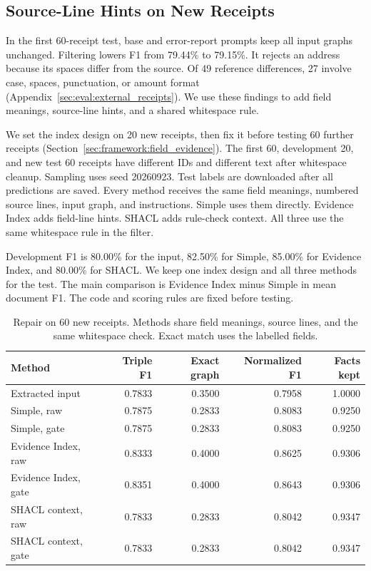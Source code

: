 \subsection{Source-Line Hints on New Receipts}
\label{sec:eval:receipt_followup}

In the first 60-receipt test, base and error-report prompts keep all input
graphs unchanged. Filtering lowers F1 from 79.44\% to 79.15\%.
It rejects an address because its spaces differ from the source.
Of 49 reference differences, 27 involve case, spaces, punctuation, or amount
format (Appendix~\ref{sec:eval:external_receipts}). We use these findings to
add field meanings, source-line hints, and a shared whitespace rule.

We set the index design on 20 new receipts, then fix it before testing 60
further receipts (Section~\ref{sec:framework:field_evidence}).
The first 60, development 20, and new test 60 receipts have different IDs
and different text after whitespace cleanup. Sampling uses seed 20260923.
Test labels are downloaded after all predictions are saved.
Every method receives the same field meanings, numbered source lines,
input graph, and instructions. Simple uses them directly.
Evidence Index adds field-line hints. SHACL adds rule-check context.
All three use the same whitespace rule in the filter.

Development F1 is 80.00\% for the input, 82.50\% for Simple,
85.00\% for Evidence Index, and 80.00\% for SHACL.
We keep one index design and all three methods for the test.
The main comparison is Evidence Index minus Simple in mean document F1.
The code and scoring rules are fixed before testing.

\begin{table}[t]
\centering
\caption{Repair on 60 new receipts. Methods share field meanings, source lines, and the same whitespace check. Exact match uses the labelled fields.}
\label{tab:receipt_followup}
\small
\begin{tabular}{lrrrr}
\toprule
Method & Triple F1 & Exact graph & Normalized F1 & Facts kept \\
\midrule
Extracted input & 0.7833 & 0.3500 & 0.7958 & 1.0000 \\
Simple, raw & 0.7875 & 0.2833 & 0.8083 & 0.9250 \\
Simple, gate & 0.7875 & 0.2833 & 0.8083 & 0.9250 \\
Evidence Index, raw & 0.8333 & 0.4000 & 0.8625 & 0.9306 \\
Evidence Index, gate & 0.8351 & 0.4000 & 0.8643 & 0.9306 \\
SHACL context, raw & 0.7833 & 0.2833 & 0.8042 & 0.9347 \\
SHACL context, gate & 0.7833 & 0.2833 & 0.8042 & 0.9347 \\
\bottomrule
\end{tabular}
\end{table}

